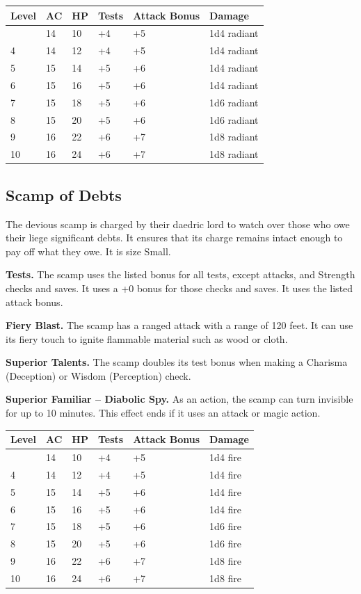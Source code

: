 \documentclass[12pt,letterpaper,twocolumn,openany,nodeprecatedcode,bg=none]{dndbook}
\begin{document}
\begin{longtable}[]{@{}llllll@{}}
\toprule\noalign{}
Level & AC & HP & Tests & Attack Bonus & Damage \\
\midrule\noalign{}
\endhead
\bottomrule\noalign{}
\endlastfoot
3 & 14 & 10 & +4 & +5 & 1d4 radiant \\
4 & 14 & 12 & +4 & +5 & 1d4 radiant \\
5 & 15 & 14 & +5 & +6 & 1d4 radiant \\
6 & 15 & 16 & +5 & +6 & 1d4 radiant \\
7 & 15 & 18 & +5 & +6 & 1d6 radiant \\
8 & 15 & 20 & +5 & +6 & 1d6 radiant \\
9 & 16 & 22 & +6 & +7 & 1d8 radiant \\
10 & 16 & 24 & +6 & +7 & 1d8 radiant \\
\end{longtable}

\subsection{Scamp of Debts}\label{scamp-of-debts}

The devious scamp is charged by their daedric lord to watch over those
who owe their liege significant debts. It ensures that its charge
remains intact enough to pay off what they owe. It is size Small.

\textbf{Tests.} The scamp uses the listed bonus for all tests, except
attacks, and Strength checks and saves. It uses a +0 bonus for those
checks and saves. It uses the listed attack bonus.

\textbf{Fiery Blast.} The scamp has a ranged attack with a range of 120
feet. It can use its fiery touch to ignite flammable material such as
wood or cloth.

\textbf{Superior Talents.} The scamp doubles its test bonus when making
a Charisma (Deception) or Wisdom (Perception) check.

\textbf{Superior Familiar -- Diabolic Spy.} As an action, the scamp can
turn invisible for up to 10 minutes. This effect ends if it uses an
attack or magic action.

\clearpage

\begin{longtable}[]{@{}llllll@{}}
\toprule\noalign{}
Level & AC & HP & Tests & Attack Bonus & Damage \\
\midrule\noalign{}
\endhead
\bottomrule\noalign{}
\endlastfoot
3 & 14 & 10 & +4 & +5 & 1d4 fire \\
4 & 14 & 12 & +4 & +5 & 1d4 fire \\
5 & 15 & 14 & +5 & +6 & 1d4 fire \\
6 & 15 & 16 & +5 & +6 & 1d4 fire \\
7 & 15 & 18 & +5 & +6 & 1d6 fire \\
8 & 15 & 20 & +5 & +6 & 1d6 fire \\
9 & 16 & 22 & +6 & +7 & 1d8 fire \\
10 & 16 & 24 & +6 & +7 & 1d8 fire \\
\end{longtable}
\end{document}
